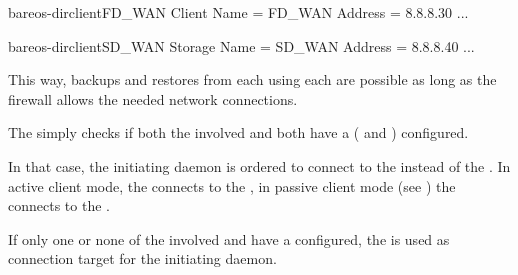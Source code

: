 \begin{bareosConfigResource}{bareos-dir}{client}{FD\_WAN}
Client {
   Name = FD_WAN
   Address = 8.8.8.30
   ...
}
\end{bareosConfigResource}

\begin{bareosConfigResource}{bareos-dir}{client}{SD\_WAN}
Storage {
   Name = SD_WAN
   Address = 8.8.8.40
   ...
}
\end{bareosConfigResource}


This way, backups and restores from each \bareosFd using each \bareosSd are possible
as long as the firewall allows the needed network connections.

The \bareosDir simply checks if both the involved \bareosFd and \bareosSd
both have a 
( and ) configured.

In that case, the initiating daemon is ordered to connect to the 
instead of the . In active client mode, the \bareosFd connects to the \bareosSd, in
passive client mode (see ) the \bareosSd connects to the \bareosFd.

If only one or none of the involved \bareosFd and \bareosSd have a 
configured, the  is used as connection target for the
initiating daemon.
